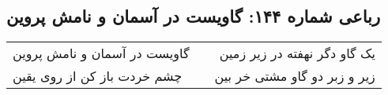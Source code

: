 \begin{center}
\section*{رباعی شماره ۱۴۴: گاویست در آسمان و نامش پروین}
\label{sec:sh144}
\begin{longtable}{l p{0.5cm} r}
گاویست در آسمان و نامش پروین
&&
یک گاو دگر نهفته در زیر زمین
\\
چشم خردت باز کن از روی یقین
&&
زیر و زبر دو گاو مشتی خر بین
\\
\end{longtable}
\end{center}
